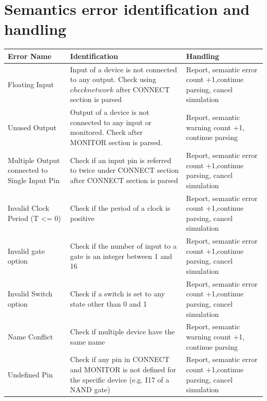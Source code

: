 \documentclass[12pt]{article}
\begin{document}
\section{Semantics error identification and handling}
\begin{center}
	\begin{tabular}{|m{3cm} | m{6cm} | m{8cm} |}
		\hline
		Error Name & Identification & Handling \\
		\hline
		Floating Input & Input of a device is not connected to any output. Check using $checknetwork$ after CONNECT section is parsed & Report, semantic error count +1,continue parsing,  cancel simulation \\
		\hline
		Unused Output & Output of a device is not connected to any input or monitored. Check after MONITOR section is parsed. & Report, semantic warning count +1, continue parsing \\
		\hline
		Multiple Output connected to Single Input Pin & Check if an input pin is referred to twice under CONNECT section after CONNECT section is parsed & Report, semantic error count +1,continue parsing,  cancel simulation \\
		\hline
		Invalid Clock Period (T <= 0) & Check if the period of a clock is positive & Report, semantic error count +1,continue parsing,  cancel simulation \\
		\hline
		Invalid gate option & Check if the number of input to a gate is an integer between 1 and 16 & Report, semantic error count +1,continue parsing,  cancel simulation \\
		\hline
		Invalid Switch option & Check if a switch is set to any state other than 0 and 1 & Report, semantic error count +1,continue parsing,  cancel simulation \\
		\hline
		Name Conflict & Check if multiple device have the same name & Report, semantic warning count +1, continue parsing \\
		\hline
		Undefined Pin & Check if any pin in CONNECT and MONITOR is not defined for the specific device (e.g. I17 of a NAND gate) & Report, semantic error count +1,continue parsing,  cancel simulation \\
		\hline
		
		
		
		
		
	\end{tabular}
\end{center}
\newpage
\end{document}
